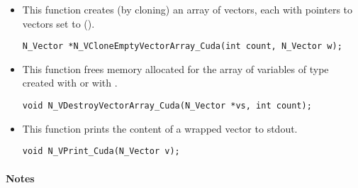 \begin{itemize}

\item {}
 
  This function creates (by cloning) an array of  {\nveccuda} vectors,
  each with pointers to {\cuda} vectors set to ().
 
\begin{verbatim}
N_Vector *N_VCloneEmptyVectorArray_Cuda(int count, N_Vector w);
\end{verbatim}


\item {}
 
 This function frees memory allocated for the array of  variables of
 type  created with  or with
 .
 

 \verb|void N_VDestroyVectorArray_Cuda(N_Vector *vs, int count);|



\item {}
  
  This function prints the content of a wrapped {\cuda} vector to stdout.
 
    
  \verb|void N_VPrint_Cuda(N_Vector v);|


\end{itemize}
\paragraph{\bf Notes} 
           

